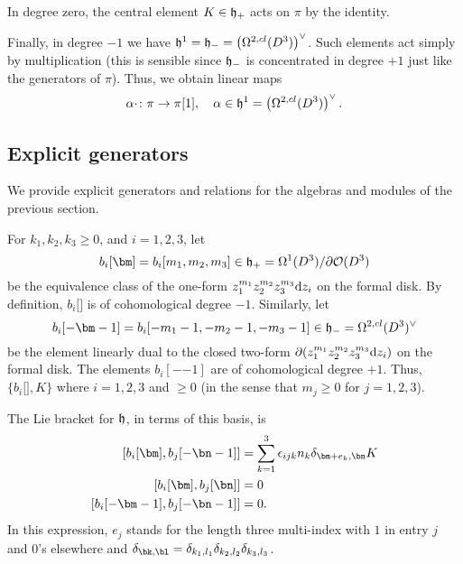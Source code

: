 \documentclass[11pt]{amsart}
\begin{document}
In degree zero, the central element $K \in \mathfrak{h}_{+}$ acts on $\pi$ by the identity.

Finally, in degree $-1$ we have $\mathfrak{h}^{1}= \mathfrak{h}_{-} = \left(\Omega^{2,cl}(D^{3})\right)^{\vee}$.
Such elements act simply by multiplication (this is sensible since $\mathfrak{h}_{-}$ is concentrated in degree $+1$ just like the generators of $\pi$).
Thus, we obtain linear maps
\begin{equation}\label{eqn:created}
  \alpha \cdot \colon \pi \to \pi [1] , \quad \alpha \in \mathfrak{h}^{1} = \left(\Omega^{2,cl}(D^{3})\right)^{\vee} .
\end{equation}

\subsection{Explicit generators}

We provide explicit generators and relations for the algebras and modules of the previous section.

For $k_{1},k_{2},k_{3} \geq 0$, and $i=1,2,3$, let
\begin{equation}\label{eqn:positive}
  b_{i}[\bm] = b_{i}[m_{1},m_{2},m_{3}] \in \lie{h}_{+} = \Omega^{1}(D^{3})/ \del \cO(D^{3})
\end{equation}
be the equivalence class of the one-form $z_{1}^{m_{1}} z_{2}^{m_{2}}z_{3}^{m_{3}} {\rm d} z_{i}$ on the formal disk.
By definition, $b_{i}[\bm]$ is of cohomological degree $-1$.
Similarly, let
\begin{equation}\label{eqn:negative}
  b_{i}[-\bm-1] = b_{i}[-m_{1}-1,-m_{2}-1,-m_{3}-1] \in \lie{h}_{-} = \Omega^{2,cl}(D^{3})^{\vee}
\end{equation}
be the element linearly dual to the closed two-form $\partial(z_{1}^{m_{1}} z_{2}^{m_{2}}z_{3}^{m_{3}} {\rm d} z_{i})$ on the formal disk.
The elements $b_{i}[-\bm-1]$ are of cohomological degree $+1$.
Thus, $\{b_{i}[\bm], K\}$ where $i=1,2,3$ and $\bm \geq 0$ (in the sense that $m_{j} \geq 0$ for $j=1,2,3$).

The Lie bracket for $\mathfrak{h}$, in terms of this basis, is
\begin{align*}
  \left[b_{i}[\bm], b_{j}[-\bn-1]\right] & = \sum_{k=1}^{3} \eps_{ijk} n_{k} \delta_{\bm+e_{k}, \bn} K \\
  \left[b_{i}[\bm], b_{j}[\bn]\right] & = 0 \\
  \left[b_{i}[-\bm-1], b_{j}[-\bn-1]\right] & = 0 .
\end{align*}
In this expression, $e_{j}$ stands for the length three multi-index with $1$ in entry $j$ and $0$'s elsewhere and $\delta_{\bk, \bl} = \delta_{k_{1},l_{1}}\delta_{k_{2},l_{2}} \delta_{k_{3},l_{3}}$.
\end{document}
